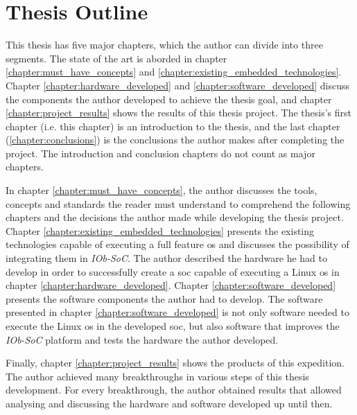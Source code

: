 \section{Thesis Outline}
\label{section:thesis_outline}
This thesis has five major chapters, which the author can divide into three segments. The state of the art is aborded in chapter \ref{chapter:must_have_concepts} and \ref{chapter:existing_embedded_technologies}. Chapter \ref{chapter:hardware_developed} and \ref{chapter:software_developed} discuss the components the author developed to achieve the thesis goal, and chapter \ref{chapter:project_results} shows the results of this thesis project. The thesis's first chapter (i.e. this chapter) is an introduction to the thesis, and the last chapter (\ref{chapter:conclusions}) is the conclusions the author makes after completing the project. The introduction and conclusion chapters do not count as major chapters.

In chapter \ref{chapter:must_have_concepts}, the author discusses the tools, concepts and standards the reader must understand to comprehend the following chapters and the decisions the author made while developing the thesis project. Chapter \ref{chapter:existing_embedded_technologies} presents the existing technologies capable of executing a full feature \acrlong{os} and discusses the possibility of integrating them in \textit{IOb-SoC}. The author described the hardware he had to develop in order to successfully create a \acrshort{soc} capable of executing a Linux \acrshort{os} in chapter \ref{chapter:hardware_developed}. Chapter \ref{chapter:software_developed} presents the software components the author had to develop. The software presented in chapter \ref{chapter:software_developed} is not only software needed to execute the Linux \acrshort{os} in the developed \acrshort{soc}, but also software that improves the \textit{IOb-SoC} platform and tests the hardware the author developed.

Finally, chapter \ref{chapter:project_results} shows the products of this expedition. The author achieved many breakthroughs in various steps of this thesis development. For every breakthrough, the author obtained results that allowed analysing and discussing the hardware and software developed up until then.
